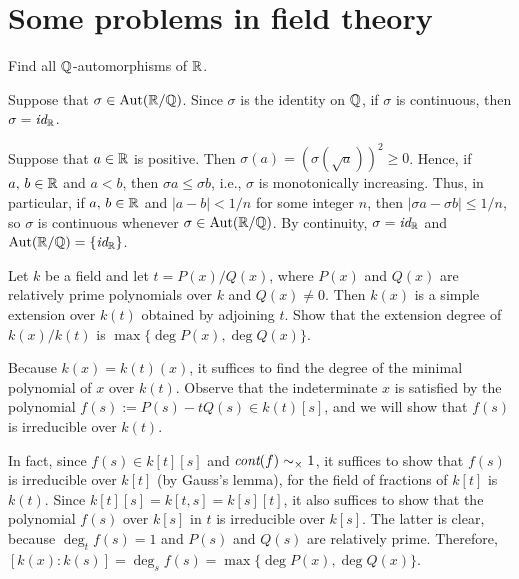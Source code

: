 \section{Some problems in field theory}

\begin{prob}
    Find all ${\mathbb{Q}}$-automorphisms of ${\mathbb{R}}$.
\end{prob}
\begin{sol}
    Suppose that $\sigma\in{\textrm{Aut}({{\mathbb{R}}/{\mathbb{Q}}})}$.
    Since $\sigma$ is the identity on ${\mathbb{Q}}$, if $\sigma$ is continuous, then $\sigma=\textit{id}_{{\mathbb{R}}}$.

    Suppose that $a\in{\mathbb{R}}$ is positive.
    Then $\sigma(a)=(\sigma(\sqrt{a}))^2\geq 0$.
    Hence, if $a,\, b\in{\mathbb{R}}$ and $a<b$, then $\sigma a\leq\sigma b$, i.e., $\sigma$ is monotonically increasing.
    Thus, in particular, if $a,\, b\in{\mathbb{R}}$ and $|a-b|<1/n$ for some integer $n$, then $|\sigma a-\sigma b|\leq 1/n$, so $\sigma$ is continuous whenever $\sigma\in{\textrm{Aut}({{\mathbb{R}}/{\mathbb{Q}}})}$.
    By continuity, $\sigma=\textit{id}_{{\mathbb{R}}}$ and ${\textrm{Aut}({{\mathbb{R}}/{\mathbb{Q}}})}=\{\textit{id}_{{\mathbb{R}}}\}$.
\end{sol}

\begin{prob}\label{degree over the field with a rational}
    Let $k$ be a field and let $t=P(x)/Q(x)$, where $P(x)$ and $Q(x)$ are relatively prime polynomials over $k$ and $Q(x)\neq 0$.
    Then $k(x)$ is a simple extension over $k(t)$ obtained by adjoining $t$.
    Show that the extension degree of $k(x)/k(t)$ is $\max\{\deg P(x), \deg Q(x)\}$.
\end{prob}
\begin{sol}
    Because $k(x)=k(t)(x)$, it suffices to find the degree of the minimal polynomial of $x$ over $k(t)$.
    Observe that the indeterminate $x$ is satisfied by the polynomial $f(s):=P(s)-t Q(s)\in k(t)[s]$, and we will show that $f(s)$ is irreducible over $k(t)$.

    In fact, since $f(s)\in k[t][s]$ and $\textit{cont}(f)\sim_\times 1$, it suffices to show that $f(s)$ is irreducible over $k[t]$ (by Gauss's lemma), for the field of fractions of $k[t]$ is $k(t)$.
    Since $k[t][s]=k[t, s]=k[s][t]$, it also suffices to show that the polynomial $f(s)$ over $k[s]$ in $t$ is irreducible over $k[s]$.
    The latter is clear, because $\deg_t f(s)=1$ and $P(s)$ and $Q(s)$ are relatively prime.
    Therefore, $[k(x): k(s)]=\deg_s f(s)=\max\{\deg P(x), \deg Q(x)\}$.
\end{sol}

